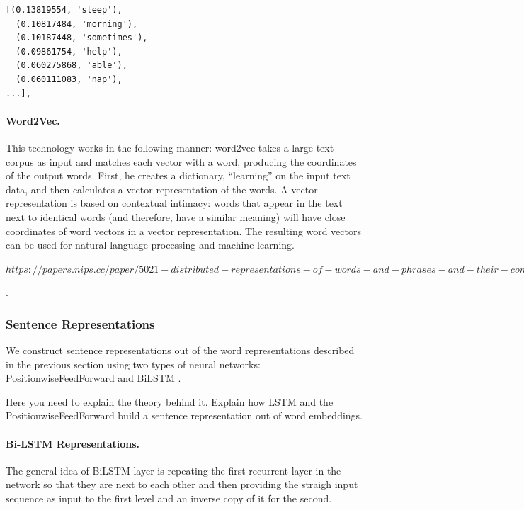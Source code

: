 \documentclass[11pt]{article}
\begin{document}
\begin{lstlisting}
[(0.13819554, 'sleep'),
  (0.10817484, 'morning'),
  (0.10187448, 'sometimes'),
  (0.09861754, 'help'),
  (0.060275868, 'able'),
  (0.060111083, 'nap'),
...],
\end{lstlisting}


\paragraph{Word2Vec.} This technology works in the following manner: word2vec takes a large text corpus as input and matches each vector with a word, producing the coordinates of the output words. First, he creates a dictionary, “learning” on the input text data, and then calculates a vector representation of the words. A vector representation is based on contextual intimacy: words that appear in the text next to identical words (and therefore, have a similar meaning) will have close coordinates of word vectors in a vector representation. The resulting word vectors can be used for natural language processing and machine learning.

$https://papers.nips.cc/paper/5021-distributed-representations-of-words-and-phrases-and-their-compositionality.pdf$

.



\subsubsection{Sentence Representations}

We construct sentence representations out of the word representations described in the previous section using two types of neural networks:  PositionwiseFeedForward \cite{vaswani2017attention} and BiLSTM .

Here you need to explain the theory behind it. Explain how LSTM and the PositionwiseFeedForward  build a sentence representation out of word embeddings.

\paragraph{Bi-LSTM Representations.} 
The general idea of BiLSTM layer is repeating the first recurrent layer in the network so that they are next to each other and then providing the straigh input sequence as input to the first level and an inverse copy of it for the second.
\end{document}
